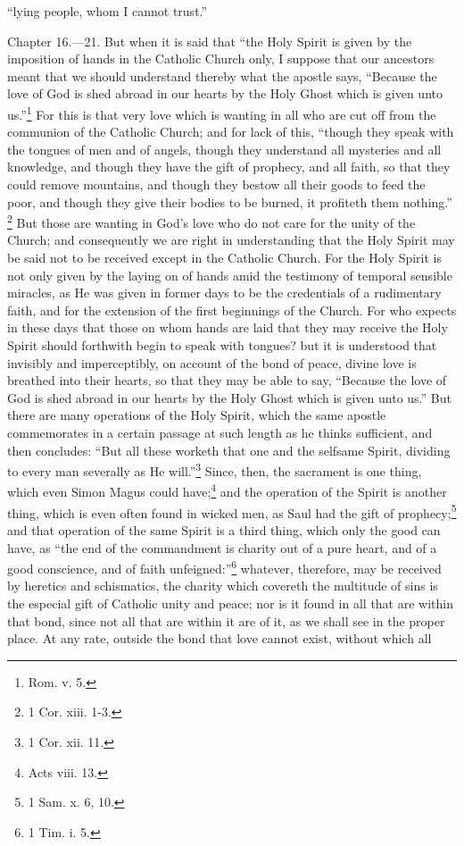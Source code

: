 ``lying people, whom I cannot trust.''


Chapter 16.—21. But when it is said that ``the Holy Spirit is given by the imposition of hands in the Catholic Church only, I suppose that our ancestors meant that we should understand thereby what the apostle says, ``Because the love of God is shed abroad in our hearts by the Holy Ghost which is given unto us.''\footnote{\par  Rom. v. 5.} For this is that very love which is wanting in all who are cut off from the communion of the Catholic Church; and for lack of this, ``though they speak with the tongues of men and of angels, though they understand all mysteries and all knowledge, and though they have the gift of prophecy, and all faith, so that they could remove mountains, and though they bestow all their goods to feed the poor, and though they give their bodies to be burned, it profiteth them nothing.'' \footnote{\par  1 Cor. xiii. 1-3.} But those are wanting in God’s love who do not care for the unity of the Church; and consequently we are right in understanding that the Holy Spirit may be said not to be received except in the Catholic Church. For the Holy Spirit is not only given by the laying on of hands amid the testimony of temporal sensible miracles, as He was given in former days to be the credentials of a rudimentary faith, and for the extension of the first beginnings of the Church. For who expects in these days that those on whom hands are laid that they may receive the Holy Spirit should forthwith begin to speak with tongues? but it is understood that invisibly and imperceptibly, on account of the bond of peace, divine love is breathed into their hearts, so that they may be able to say, ``Because the love of God is shed abroad in our hearts by the Holy Ghost which is given unto us.'' But there are many operations of the Holy Spirit, which the same apostle commemorates in a certain passage at such length as he thinks sufficient, and then concludes: ``But all these worketh that one and the selfsame Spirit, dividing to every man severally as He will.''\footnote{\par  1 Cor. xii. 11.} Since, then, the sacrament is one thing, which even Simon Magus could have;\footnote{\par  Acts viii. 13.} and the operation of the Spirit is another thing, which is even often found in wicked men, as Saul had the gift of prophecy;\footnote{\par  1 Sam. x. 6, 10.} and that operation of the same Spirit is a third thing, which only the good can have, as ``the end of the commandment is charity out of a pure heart, and of a good conscience, and of faith unfeigned:''\footnote{\par  1 Tim. i. 5.} whatever, therefore, may be received by heretics and schismatics, the charity which covereth the multitude of sins is the especial gift of Catholic unity and peace; nor is it found in all that are within that bond, since not all that are within it are of it, as we shall see in the proper place. At any rate, outside the bond that love cannot exist, without which all 